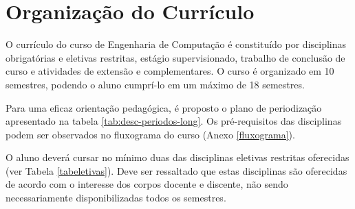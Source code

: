 \section{Organização do Currículo}

O currículo do curso de Engenharia de Computação é constituído por disciplinas obrigatórias e eletivas restritas, estágio supervisionado, trabalho de conclusão de curso e atividades de extensão e complementares. O curso é organizado em 10 semestres, podendo o aluno cumprí-lo em um máximo de 18 semestres.

Para uma eficaz orientação pedagógica, é proposto o plano de periodização apresentado na tabela \ref{tab:desc-periodos-long}. Os pré-requisitos das disciplinas podem ser observados no fluxograma do curso (Anexo \ref{fluxograma}).

O aluno deverá cursar no mínimo duas das disciplinas eletivas restritas oferecidas (ver Tabela \ref{tabeletivas}). Deve ser
ressaltado que estas disciplinas são oferecidas de acordo com o interesse dos corpos
docente e discente, não sendo necessariamente disponibilizadas todos os semestres.


